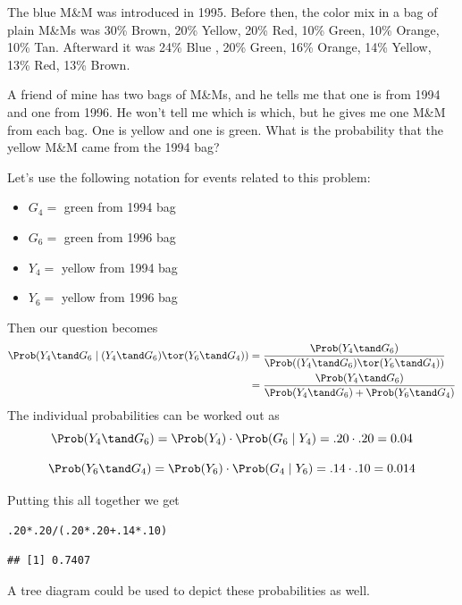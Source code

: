 \documentclass[twoside]{book}\usepackage[]{graphicx}\usepackage[]{xcolor}
\makeatletter
\newcommand{\hlnum}[1]{\textcolor[rgb]{0.686,0.059,0.569}{#1}}%
\newcommand{\hlopt}[1]{\textcolor[rgb]{0,0,0}{#1}}%
\newcommand{\hlstd}[1]{\textcolor[rgb]{0.345,0.345,0.345}{#1}}%
\newenvironment{kframe}{%
 \def\at@end@of@kframe{}%
 \ifinner\ifhmode%
  \def\at@end@of@kframe{\end{minipage}}%
  \begin{minipage}{\columnwidth}%
 \fi\fi%
 \def\FrameCommand##1{\hskip\@totalleftmargin \hskip-\fboxsep
 \colorbox{shadecolor}{##1}\hskip-\fboxsep
     \hskip-\linewidth \hskip-\@totalleftmargin \hskip\columnwidth}%
 \MakeFramed {\advance\hsize-\width
   \@totalleftmargin\z@ \linewidth\hsize
   \@setminipage}}%
 {\par\unskip\endMakeFramed%
 \at@end@of@kframe}
\newenvironment{knitrout}{}{} %
\makeatother
\begin{document}
\begin{problem}
The blue M\&M was introduced in 1995.  
Before then, the color mix in a bag of plain M\&Ms was 
30\% Brown, 20\% Yellow, 20\% Red, 10\% Green, 10\% Orange, 10\% Tan.  
Afterward it was 24\% Blue , 20\% Green, 16\% Orange, 14\% Yellow, 13\% Red, 
13\% Brown. 

A friend of mine has two bags of M\&Ms, and he tells me that one is from 
1994 and one from 1996.  He won't tell me which is which, but he gives me one 
M\&M from each bag.  One is yellow and one is green.  
What is the probability that the yellow M\&M came from the 1994 bag?
\end{problem}

\begin{solution}
Let's use the following notation for events related to this problem:
  \begin{itemize}
  \item $G_4 = $ green from 1994 bag
  \item $G_6 = $ green from 1996 bag
  \item $Y_4 = $ yellow from 1994 bag
  \item $Y_6 = $ yellow from 1996 bag
  \end{itemize}

Then our question becomes 
\begin{align*}
\Prob( Y_4 \tand G_6 \mid 
       (Y_4 \tand G_6) \tor (Y_6 \tand G_4) )
       & =
\frac{\Prob( Y_4 \tand G_6 ) }
     {\Prob( (Y_4 \tand G_6) \tor (Y_6 \tand G_4) )}
\\
& = \frac{\Prob( Y_4 \tand G_6 ) }
     {\Prob(Y_4 \tand G_6) + \Prob(Y_6 \tand G_4)}
\end{align*}
The individual probabilities can be worked out as
\[
\Prob(Y_4 \tand G_6) = \Prob(Y_4) \cdot \Prob(G_6 \mid Y_4)
=
.20 \cdot .20 = 0.04
\]

\[
\Prob(Y_6 \tand G_4) = \Prob(Y_6) \cdot \Prob(G_4 \mid Y_6)
=
.14 \cdot .10 = 0.014
\]

Putting this all together we get

\begin{knitrout}
\color{fgcolor}\begin{kframe}
\begin{alltt}
\hlnum{.20} \hlopt{*} \hlnum{.20} \hlopt{/} \hlstd{(}\hlnum{.20} \hlopt{*} \hlnum{.20} \hlopt{+} \hlnum{.14} \hlopt{*} \hlnum{.10}\hlstd{)}
\end{alltt}
\begin{verbatim}
## [1] 0.7407
\end{verbatim}
\end{kframe}
\end{knitrout}

A tree diagram could be used to depict these probabilities as well.
\end{solution}
\end{document}
